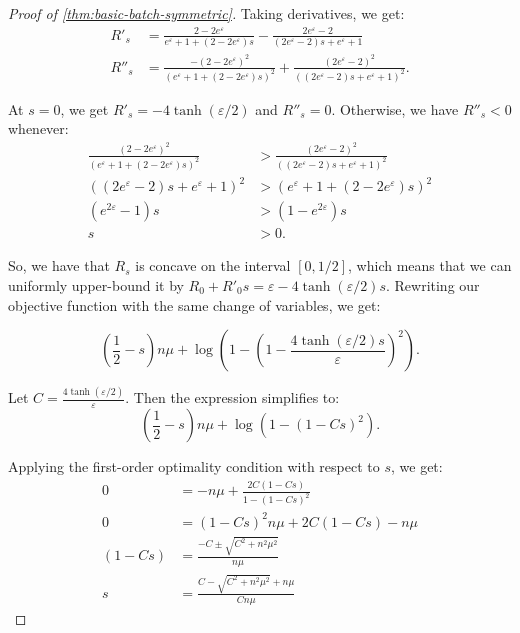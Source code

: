 \documentclass[10pt,a4paper]{amsart}
\begin{document}
\begin{proof}[Proof of \cref{thm:basic-batch-symmetric}]
    Taking derivatives, we get:
    \begin{align*}
        R'_s &= \frac{2-2e^\varepsilon}{e^\varepsilon+1+(2-2e^\varepsilon)s} - \frac{2e^\varepsilon-2}{(2e^\varepsilon-2)s+e^\varepsilon+1} \\
        R''_s &= \frac{-(2-2e^\varepsilon)^2}{(e^\varepsilon+1+(2-2e^\varepsilon)s)^2} + \frac{(2e^\varepsilon-2)^2}{((2e^\varepsilon-2)s+e^\varepsilon+1)^2}.
    \end{align*}

    At $s=0$, we get $R'_s = -4\tanh(\varepsilon/2)$ and $R''_s=0$. Otherwise, we have $R''_s < 0$ whenever:
    \begin{align*}
        \frac{(2-2e^\varepsilon)^2}{(e^\varepsilon+1+(2-2e^\varepsilon)s)^2} 
        &> 
        \frac{(2e^\varepsilon-2)^2}{((2e^\varepsilon-2)s+e^\varepsilon+1)^2} 
        \\
        ((2e^\varepsilon-2)s+e^\varepsilon+1)^2
        &> 
        (e^\varepsilon+1+(2-2e^\varepsilon)s)^2
        \\
        (e^{2\varepsilon}-1)s 
        &>
        (1-e^{2\varepsilon})s \\
        s &> 0.
    \end{align*}

    So, we have that $R_s$ is concave on the interval $[0, 1/2]$, which means that we can uniformly upper-bound it by $R_0 + R'_0s = \varepsilon - 4\tanh(\varepsilon/2)s$. Rewriting our objective function with the same change of variables, we get:

    \begin{equation*}
        \left(\frac{1}{2}-s\right)n\mu + \log\left(1 - \left( 1 - \frac{4\tanh(\varepsilon/2)s}{\varepsilon} \right)^2 \right).
    \end{equation*}

    Let $C = \frac{4\tanh(\varepsilon/2)}{\varepsilon}$. Then the expression simplifies to:
    \begin{equation*}
        \left(\frac{1}{2}-s\right)n\mu + \log\left(1 - \left( 1 - Cs \right)^2 \right).
    \end{equation*}

    Applying the first-order optimality condition with respect to $s$, we get:
    \begin{align*}
        0 &= -n\mu + \frac{2C(1-Cs)}{1-(1-Cs)^2} \\
        0 &= (1-Cs)^2n\mu + 2C(1-Cs) - n\mu \\
        (1-Cs) &= \frac{-C \pm \sqrt{C^2+n^2\mu^2}}{n\mu} \\
        s &= \frac{C - \sqrt{C^2+n^2\mu^2} +n\mu}{Cn\mu}     
        \end{align*}


\end{proof}
\end{document}
